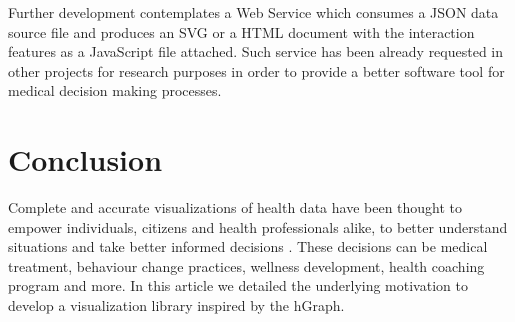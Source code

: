 \documentclass[twocolumn]{bmcart}%
\begin{document}
Further development contemplates a Web Service which consumes a JSON data source file and produces an SVG or a HTML document with the interaction features as a JavaScript file attached. Such service has been already requested in other projects for research purposes in order to provide a better software tool for medical decision making processes.


\section*{Conclusion}




Complete and accurate visualizations of health data have been thought to empower individuals, citizens and health professionals alike, to better understand situations and take better informed decisions \cite{lesselroth2011data, shneiderman2013improving, rind2011interactive}. These decisions can be medical treatment, behaviour change practices, wellness development, health coaching program and more. In this article we detailed the underlying motivation to develop a visualization library inspired by the hGraph. 
\end{document}
